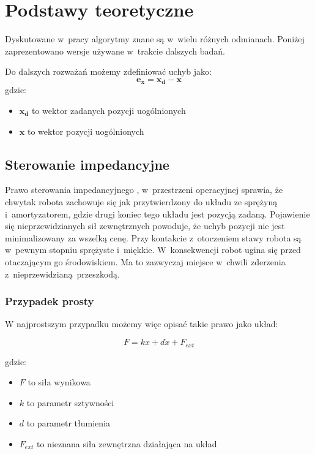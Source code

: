 
\chapter{Podstawy teoretyczne\label{chap:przeglad_literatury}}
Dyskutowane w~pracy algorytmy znane są w~wielu różnych odmianach. Poniżej zaprezentowano wersje używane w~trakcie dalszych badań. 

Do dalszych rozważań możemy zdefiniować uchyb jako:
\begin{equation}
	\boldsymbol{e_x} = \boldsymbol{x_d} - \boldsymbol{x}
\end{equation}
gdzie:
\begin{itemize}
\item $\boldsymbol{x_d}$ to wektor zadanych pozycji uogólnionych
\item $\boldsymbol{x}$ to wektor pozycji uogólnionych
\end{itemize}

\section{Sterowanie impedancyjne}
Prawo sterowania impedancyjnego \cite{bib:impedance}, \cite{wiki:Impedance_control} w~przestrzeni operacyjnej sprawia, że chwytak robota zachowuje się jak przytwierdzony do układu ze sprężyną i~amortyzatorem, gdzie drugi koniec tego układu jest pozycją zadaną. Pojawienie się nieprzewidzianych sił zewnętrznych powoduje, że uchyb pozycji nie jest minimalizowany za wszelką cenę. Przy kontakcie z~otoczeniem stawy robota są w~pewnym stopniu sprężyste i~miękkie. W~konsekwencji robot ugina się przed otaczającym go środowiskiem. Ma to zazwyczaj miejsce w~chwili zderzenia z~nieprzewidzianą przeszkodą. 

\subsection{Przypadek prosty}
W najprostszym przypadku możemy więc opisać takie prawo jako układ: 

	\begin{equation}
	F = kx + d\dot{x} + F_{ext}
	\end{equation}

gdzie:
\begin{itemize}
\item $F$ to siła wynikowa
\item $k$ to parametr sztywności
\item $d$ to parametr tłumienia
\item $F_{ext}$ to nieznana siła zewnętrzna działająca na układ
\end{itemize} 

